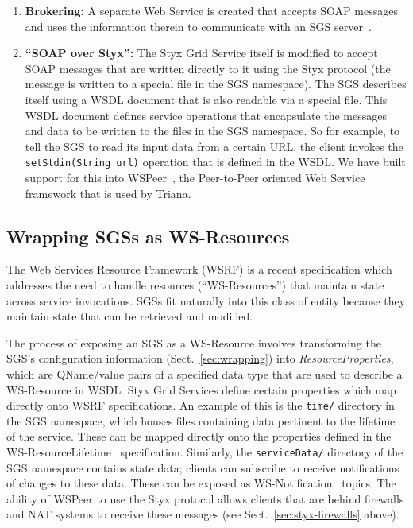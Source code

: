 \documentclass{llncs}
\begin{document}
\begin{enumerate}
	\item {\bf Brokering:} A separate Web Service is created that accepts SOAP messages and uses the information therein to communicate with an SGS server~\cite{blower:2005}.
	\item {\bf ``SOAP over Styx'':} The Styx Grid Service itself is modified to accept SOAP messages that are written directly to it using the Styx protocol (the message is written to a special file in the SGS namespace).  The SGS describes itself using a WSDL document that is also readable via a special file.  This WSDL document defines service operations that encapsulate the messages and data to be written to the files in the SGS namespace.  So for example, to tell the SGS to read its input data from a certain URL, the client invokes the {\tt setStdin(String url)} operation that is defined in the WSDL.  We have built support for this into WSPeer~\cite{wspeer}, the Peer-to-Peer oriented Web Service framework that is used by Triana.
\end{enumerate}

\subsection{Wrapping SGSs as WS-Resources}\label{subsec:ws-resources}

The Web Services Resource Framework (WSRF) is a recent specification which addresses the need to handle resources (``WS-Resources'') that maintain state across service invocations.  SGSs fit naturally into this class of entity because they maintain state that can be retrieved and modified.

The process of exposing an SGS as a WS-Resource involves transforming the SGS's configuration information (Sect.~\ref{sec:wrapping}) into {\em ResourceProperties\/}, which are QName/value pairs of a specified data type that are used to describe a WS-Resource in WSDL.  Styx Grid Services define certain properties which map directly onto WSRF specifications.  An example of this is the {\tt time/} directory in the SGS namespace, which houses files containing data pertinent to the lifetime of the service.  These can be mapped directly onto the properties defined in the WS-ResourceLifetime~\cite{wsrf-lifetime} specification.  Similarly, the {\tt serviceData/} directory of the SGS namespace contains state data; clients can subscribe to receive notifications of changes to these data.  These can be exposed as WS-Notification~\cite{wsrf-notification} topics.  The ability of WSPeer to use the Styx protocol allows clients that are behind firewalls and NAT systems to receive these messages (see Sect.~\ref{sec:styx-firewalls} above).
\end{document}
